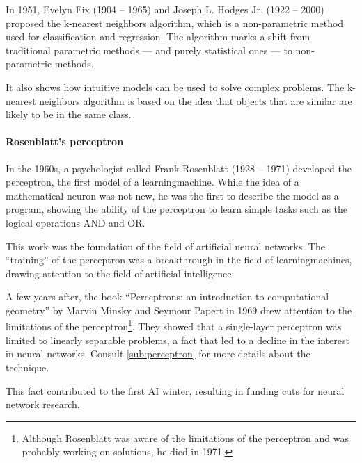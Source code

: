 In 1951, Evelyn Fix (1904 -- 1965) and Joseph L. Hodges Jr. (1922 -- 2000) proposed the
k-nearest neighbors algorithm,
which is a non-parametric method used for classification and regression.  The algorithm
marks a shift from traditional parametric methods --- and purely statistical ones ---
to non-parametric methods.

It also shows how intuitive models can be used to solve complex problems.  The k-nearest
neighbors algorithm is based on the idea that objects that are similar are likely to be in
the same class.


\paragraph{Rosenblatt's perceptron}

In the 1960s, a psychologist called Frank Rosenblatt (1928 -- 1971) developed the
perceptron, the first model of a \gls{learningmachine}.  While the idea of a mathematical neuron was not new, he was the first
to describe the model as a program, showing the ability of the perceptron to learn simple
tasks such as the logical operations AND and OR.

This work was the foundation of the field of artificial neural networks.  The ``training''
of the perceptron was a breakthrough in the field of \glspl{learningmachine}, drawing attention
to the field of artificial intelligence.


A few years after, the book ``Perceptrons: an introduction to computational geometry'' by
Marvin Minsky and Seymour Papert in 1969 drew attention to the limitations of the
perceptron\footnote{Although Rosenblatt was aware of the limitations of the perceptron
and was probably working on solutions, he died in 1971.}. They showed that a single-layer
perceptron was limited to linearly separable problems, a fact that led to a decline in the
interest in neural networks.
Consult \cref{sub:perceptron} for more details about the technique.

This fact contributed to the first AI winter, resulting in funding cuts for neural
network research.

